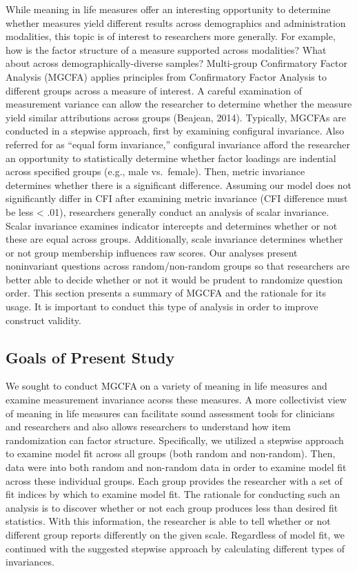 \documentclass[man,draftall]{apa6}
\begin{document}
While meaning in life measures offer an interesting opportunity to determine whether measures yield different results across demographics and administration modalities, this topic is of interest to researchers more generally. For example, how is the factor structure of a measure supported across modalities? What about across demographically-diverse samples? Multi-group Confirmatory Factor Analysis (MGCFA) applies principles from Confirmatory Factor Analysis to different groups across a measure of interest. A careful examination of measurement variance can allow the researcher to determine whether the measure yield similar attributions across groups (Beajean, 2014). Typically, MGCFAs are conducted in a stepwise approach, first by examining configural invariance. Also referred for as \enquote{equal form invariance,} configural invariance afford the researcher an opportunity to statistically determine whether factor loadings are indential across specified groups (e.g., male vs.~female). Then, metric invariance determines whether there is a significant difference. Assuming our model does not significantly differ in CFI after examining metric invariance (CFI difference must be less \textless{} .01), researchers generally conduct an analysis of scalar invariance. Scalar invariance examines indicator intercepts and determines whether or not these are equal across groups. Additionally, scale invariance determines whether or not group membership influences raw scores. Our analyses present noninvariant questions across random/non-random groups so that researchers are better able to decide whether or not it would be prudent to randomize question order. This section presents a summary of MGCFA and the rationale for its usage. It is important to conduct this type of analysis in order to improve construct validity.

\hypertarget{goals-of-present-study}{%
\subsection{Goals of Present Study}\label{goals-of-present-study}}

We sought to conduct MGCFA on a variety of meaning in life measures and examine measurement invariance acorss these measures. A more collectivist view of meaning in life measures can facilitate sound assessment tools for clinicians and researchers and also allows researchers to understand how item randomization can factor structure. Specifically, we utilized a stepwise approach to examine model fit across all groups (both random and non-random). Then, data were into both random and non-random data in order to examine model fit across these individual groups. Each group provides the researcher with a set of fit indices by which to examine model fit. The rationale for conducting such an analysis is to discover whether or not each group produces less than desired fit statistics. With this information, the researcher is able to tell whether or not different group reports differently on the given scale. Regardless of model fit, we continued with the suggested stepwise approach by calculating different types of invariances.
\end{document}
